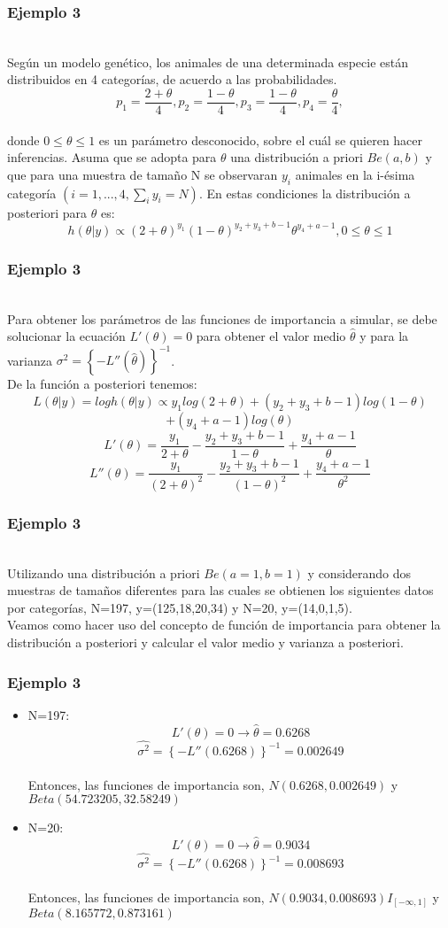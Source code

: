 \documentclass[12pt]{beamer}
\begin{document}
\begin{frame}
\frametitle{Ejemplo 3}
~\\Según un modelo genético, los animales de una determinada especie están distribuidos en 4 categorías, de acuerdo a las probabilidades.
$$p_{1}=\frac{2+\theta}{4}, p_{2}=\frac{1-\theta}{4}, p_{3}=\frac{1-\theta}{4}, p_{4}=\frac{\theta}{4},$$
~\\donde $0\leq \theta \leq 1$ es un parámetro desconocido, sobre el cuál se quieren hacer inferencias. Asuma que se adopta para $\theta$ una distribución a priori $Be(a,b)$ y que para una muestra de tamaño N se observaran $y_{i}$ animales en la i-ésima categoría $(i=1,...,4, \sum_{i}y_{i}=N)$. En estas condiciones la distribución a posteriori para $\theta$ es:
$$h(\theta|y)\propto(2+\theta)^{y_{1}}(1-\theta)^{y_{2}+y_{3}+b-1}\theta^{y_{4}+a-1},   0\leq\theta\leq1 $$
\end{frame}

\begin{frame}
\frametitle{Ejemplo 3}
~\\Para obtener los parámetros de las funciones de importancia a simular, se debe solucionar la ecuación $L'(\theta)=0$ para obtener el valor medio $\hat{\theta}$ y  para la varianza $\sigma^2=\left\lbrace -L''(\hat{\theta})\right\rbrace ^{-1}$.
~\\De la función a posteriori tenemos:
$$L(\theta|y)=log h(\theta|y)\propto y_{1}log(2+\theta)+(y_{2}+y_{3}+b-1)log(1-\theta)$$
$$+(y_{4}+a-1)log(\theta)$$
$$L'(\theta)=\frac{y_{1}}{2+\theta}-\frac{y_{2}+y_{3}+b-1}{1-\theta}+\frac{y_{4}+a-1}{\theta}$$
$$L''(\theta)=\frac{y_{1}}{(2+\theta)^2}-\frac{y_{2}+y_{3}+b-1}{(1-\theta)^2}+\frac{y_{4}+a-1}{\theta^2}$$
\end{frame}

\begin{frame}
\frametitle{Ejemplo 3}
~\\Utilizando una distribución a priori $Be(a=1,b=1)$ y considerando dos muestras de tamaños diferentes para las cuales se obtienen los siguientes datos por categorías, N=197, y=(125,18,20,34) y N=20, y=(14,0,1,5).
~\\Veamos como hacer uso del concepto de función de importancia para obtener la distribución a posteriori y calcular el valor medio y varianza a posteriori.
\end{frame}

\begin{frame}
\frametitle{Ejemplo 3}
\begin{itemize}
\item N=197: $$L'(\theta)=0\rightarrow \hat{\theta}=0.6268$$
$$\hat{\sigma^2}=\left\lbrace -L''(0.6268) \right\rbrace ^{-1}=0.002649 $$
~\\Entonces, las funciones de importancia son, $N(0.6268,0.002649)$ y $Beta(54.723205,32.58249)$
\item N=20: $$L'(\theta)=0\rightarrow \hat{\theta}=0.9034$$
$$\hat{\sigma^2}=\left\lbrace -L''(0.6268) \right\rbrace ^{-1}=0.008693 $$
~\\Entonces, las funciones de importancia son, $N(0.9034,0.008693)I_{[-\infty,1]}$ y $Beta(8.165772,0.873161)$
\end{itemize}
\end{frame}
\end{document}
